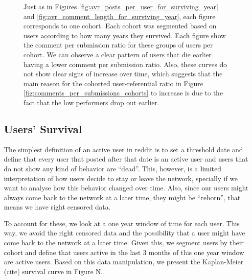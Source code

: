 \begin{figure}[!tb]
\caption{Just as in Figures \ref{fig:avr_posts_per_user_for_surviving_year} and \ref{fig:avr_comment_length_for_surviving_year}, each figure corresponds to one cohort. Each cohort was segmented based on users according to how many years they survived. Each figure show the comment per submission ratio for these groups of users per cohort. We can observe a clear pattern of users that die earlier having a lower comment per submission ratio. Also, these curves do not show clear signs of increase over time, which suggests that the main reason for the cohorted user-referential ratio in Figure \ref{fig:comments_per_submissions_cohorts} to increase is due to the fact that the low performers drop out earlier.}
\label{fig:comments_per_submissions_for_surviving_year}
\end{figure}

\subsection{Users' Survival}

The simplest definition of an active user in reddit is to set a threshold date and define that every user that posted after that date is an active user and users that do not show any kind of behavior are ``dead''. This, however, is a limited interpretation of how users decide to stay or leave the network, specially if we want to analyse how this behavior changed over time. Also, since our users might always come back to the network at a later time, they might be ``reborn'', that means we have right censored data.

To account for these, we look at a one year window of time for each user. This way, we avoid the right censored data and the possibility that a user might have come back to the network at a later time. Given this, we segment users by their cohort and define that users active in the last 3 months of this one year window are active users. Based on this data manipulation, we present the Kaplan-Meier (cite) survival curve in Figure N.

